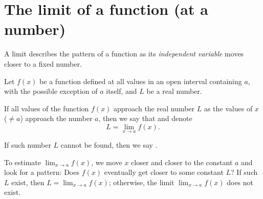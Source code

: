 \documentclass[../main.tex]{subfiles}
\begin{document}
 \section{The limit of a function (at a number)}
A limit describes the pattern of a function as its \emph{independent variable} moves closer to a fixed number.

\begin{mdframed}[style=withref-compact]
  Let \(f(x)\) be a function defined at all values in an open interval containing \(a\), with the possible exception of \(a\) itself, and \(L\) be a real number. 

  If all values of the function \(f(x)\) approach the real number \(L\) as the values of \(x\) (\(\ne a\)) approach the number \(a\), then we say that  and denote
  \[
    L = \lim_{x \to a} f(x).
  \]

  If such number \(L\) cannot be found, then we say .

\end{mdframed}

\faLightbulb{} To estimate \(\lim_{x \to a} f(x)\), we move \(x\) closer and closer to the constant \(a\) \underline{\hspace{6cm}} and look for a pattern: Does \(f(x)\) eventually get \underline{\hspace{3cm}} closer to some constant \(L\)? If such \(L\) exist, then \(L = \lim_{x \to a} f(x)\); otherwise, the limit \(\lim_{x \to a}f(x)\) does not exist.

\end{document}
